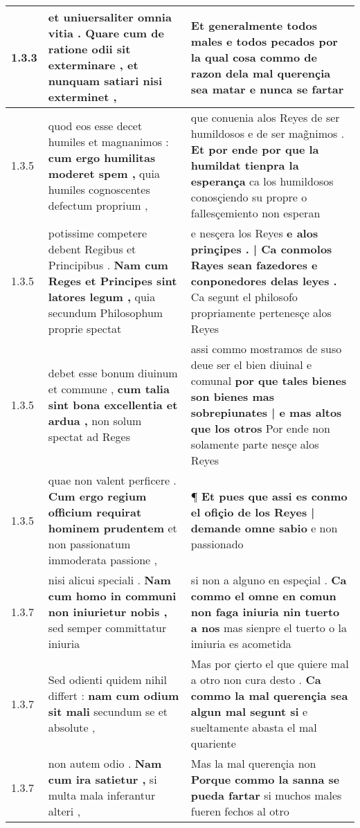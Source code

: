 \begin{tabular}{|p{1cm}|p{6.5cm}|p{6.5cm}|}
1.3.3 & et uniuersaliter omnia vitia . \textbf{ Quare cum de ratione odii sit exterminare , } et nunquam satiari nisi exterminet , & Et generalmente todos males e todos pecados \textbf{ por la qual cosa commo de razon dela mal querençia sea matar } e nunca se fartar \\\hline
1.3.5 & quod eos esse decet humiles et magnanimos : \textbf{ cum ergo humilitas moderet spem , } quia humiles cognoscentes defectum proprium , & que conuenia alos Reyes de ser humildosos e de ser mag̃nimos . \textbf{ Et por ende por que la humildat tienpra la esperança } ca los humildosos conosçiendo su propre o fallesçemiento non esperan \\\hline
1.3.5 & potissime competere debent Regibus et Principibus . \textbf{ Nam cum Reges et Principes sint latores legum , } quia secundum Philosophum proprie spectat & e nesçera los Reyes \textbf{ e alos prinçipes . | Ca conmolos Rayes sean fazedores e conponedores delas leyes . } Ca segunt el philosofo propriamente pertenesçe alos Reyes \\\hline
1.3.5 & debet esse bonum diuinum et commune , \textbf{ cum talia sint bona excellentia et ardua , } non solum spectat ad Reges & assi commo mostramos de suso deue ser el bien diuinal e comunal \textbf{ por que tales bienes son bienes mas sobrepiunates | e mas altos que los otros } Por ende non solamente parte nesçe alos Reyes \\\hline
1.3.5 & quae non valent perficere . \textbf{ Cum ergo regium officium requirat hominem prudentem } et non passionatum immoderata passione , & ¶ \textbf{ Et pues que assi es conmo el ofiçio de los Reyes | demande omne sabio } e non passionado \\\hline
1.3.7 & nisi alicui speciali . \textbf{ Nam cum homo in communi non iniurietur nobis , } sed semper committatur iniuria & si non a alguno en espeçial . \textbf{ Ca commo el omne en comun non faga iniuria nin tuerto a nos } mas sienpre el tuerto o la imiuria es acometida \\\hline
1.3.7 & Sed odienti quidem nihil differt : \textbf{ nam cum odium sit mali } secundum se et absolute , & Mas por çierto el que quiere mal a otro non cura desto . \textbf{ Ca commo la mal querençia sea algun mal segunt si } e sueltamente abasta el mal quariente \\\hline
1.3.7 & non autem odio . \textbf{ Nam cum ira satietur , } si multa mala inferantur alteri , & Mas la mal querençia non \textbf{ Porque commo la sanna se pueda fartar } si muchos males fueren fechos al otro \\\hline

\end{tabular}
